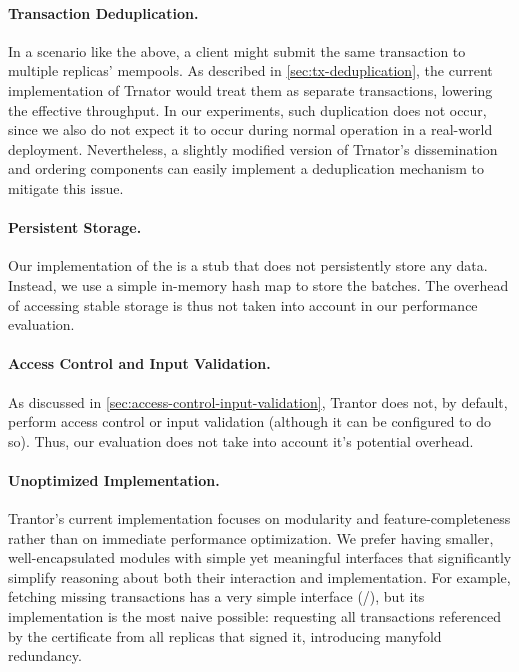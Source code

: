 \documentclass{article}
\begin{document}
\paragraph{Transaction Deduplication.}
In a scenario like the above, a client might submit the same transaction to multiple replicas' mempools.
As described in \cref{sec:tx-deduplication}, the current implementation of Trnator would treat them as separate transactions,
lowering the effective throughput.
In our experiments, such duplication does not occur, since we also do not expect it to occur during normal operation in a real-world deployment.
Nevertheless, a slightly modified version of Trnator's dissemination and ordering components
can easily implement a deduplication mechanism \cite{mirbft,iss} to mitigate this issue.

\paragraph{Persistent Storage.}
Our implementation of the  is a stub that does not persistently store any data.
Instead, we use a simple in-memory hash map to store the batches.
The overhead of accessing stable storage is thus not taken into account in our performance evaluation.

\paragraph{Access Control and Input Validation.}
As discussed in \cref{sec:access-control-input-validation}, Trantor does not, by default, perform access control or input validation
(although it can be configured to do so).
Thus, our evaluation does not take into account it's potential overhead.

\paragraph{Unoptimized Implementation.}
Trantor's current implementation focuses on modularity and feature-completeness rather than on immediate performance optimization.
We prefer having smaller, well-encapsulated modules with simple yet meaningful interfaces
that significantly simplify reasoning about both their interaction and implementation.
For example, fetching missing transactions has a very simple interface (/),
but its implementation is the most naive possible: requesting all transactions referenced by the certificate from all replicas that signed it,
introducing manyfold redundancy.
\end{document}
